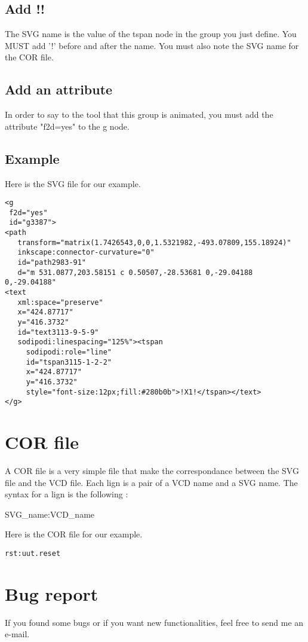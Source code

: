 \documentclass{article}
\begin{document}
\subsection{Add !!}
The SVG name is  the value of the tspan node in the group you just define. You MUST add '!' before and after the name. You must also note the SVG name for
the COR file.
\subsection{Add an attribute}
In order to say to the tool that this group is animated, you must add the attribute "f2d=yes" to the g node.
\subsection{Example}
Here is the SVG file for our example.
\begin{lstlisting}
<g
 f2d="yes"
 id="g3387">
<path
   transform="matrix(1.7426543,0,0,1.5321982,-493.07809,155.18924)"
   inkscape:connector-curvature="0"
   id="path2983-91"
   d="m 531.0877,203.58151 c 0.50507,-28.53681 0,-29.04188 0,-29.04188"
<text
   xml:space="preserve"
   x="424.87717"
   y="416.3732"
   id="text3113-9-5-9"
   sodipodi:linespacing="125%"><tspan
	 sodipodi:role="line"
	 id="tspan3115-1-2-2"
	 x="424.87717"
	 y="416.3732"
	 style="font-size:12px;fill:#280b0b">!X1!</tspan></text>
</g>
\end{lstlisting}

\section{COR file}
A COR file is a very simple file that make the correspondance between the SVG file and the VCD file. Each lign is a pair of a VCD name and a SVG name. The syntax for
a lign is the following :
\begin{center}
SVG\_name:VCD\_name
\end{center}
Here is the COR file for our example.
\begin{lstlisting}
rst:uut.reset
\end{lstlisting}

\section{Bug report}
If you found some bugs or if you want new functionalities, feel free to send me an e-mail. 
\end{document}
